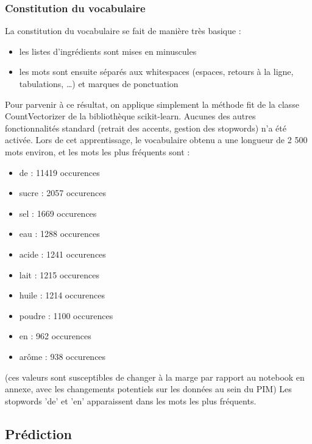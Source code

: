             \subsubsection{Constitution du vocabulaire}

            La constitution du vocabulaire se fait de manière très basique : 
            \begin{itemize}
                \item les listes d'ingrédients sont mises en minuscules
                \item les mots sont ensuite séparés aux whitespaces (espaces, retours à la ligne, tabulations, \dots) et marques de ponctuation
            \end{itemize}
            Pour parvenir à ce résultat, on applique simplement la méthode fit de la classe CountVectorizer de la bibliothèque scikit-learn.
            Aucunes des autres fonctionnalités standard (retrait des accents, gestion des stopwords) n'a été activée.
            Lors de cet apprentissage, le vocabulaire obtenu a une longueur de 2 500 mots environ, et les mots les plus fréquents sont :
            \begin{itemize}
                \item de     : 11419 occurences
                \item sucre  :  2057 occurences 
                \item sel    :  1669 occurences
                \item eau    :  1288 occurences
                \item acide  :  1241 occurences
                \item lait   :  1215 occurences
                \item huile  :  1214 occurences
                \item poudre :  1100 occurences
                \item en     :   962 occurences
                \item arôme  :   938 occurences
            \end{itemize}
            (ces valeurs sont susceptibles de changer à la marge par rapport au notebook en annexe, avec les changements potentiels sur les données au sein du PIM)
            Les stopwords 'de' et 'en' apparaissent dans les mots les plus fréquents.        
        
        \subsection{Prédiction}
            
